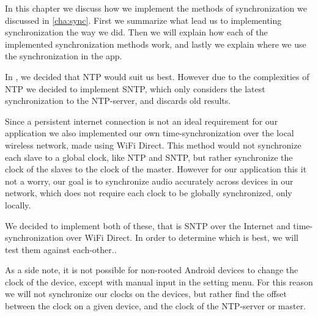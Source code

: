 In this chapter we discuss how we implement the methods of synchronization we discussed in \cref{cha:sync}.
First we summarize what lead us to implementing synchronization the way we did.
Then we will explain how each of the implemented synchronization methods work, and lastly we explain where we use the synchronization in the app.

In , we decided that \ac{NTP} would suit us best.
However due to the complexities of \ac{NTP} we decided to implement \ac{SNTP}, which only considers the latest synchronization to the \ac{NTP}-server, and discards old results.

Since a persistent internet connection is not an ideal requirement for our application we also implemented our own time-synchronization over the local wireless network, made using WiFi Direct.
This method would not synchronize each slave to a global clock, like \ac{NTP} and \ac{SNTP}, but rather synchronize the clock of the slaves to the clock of the master.
However for our application this it not a worry, our goal is to synchronize audio accurately across devices in our network, which does not require each clock to be globally synchronized, only locally.

We decided to implement both of these, that is \ac{SNTP} over the Internet and time-synchronization over WiFi Direct.
In order to determine which is best, we will test them against each-other..

As a side note, it is not possible for non-rooted Android devices to change the clock of the device, except with manual input in the setting menu.
For this reason we will not synchronize our clocks on the devices, but rather find the offset between the clock on a given device, and the clock of the \ac{NTP}-server or master.
